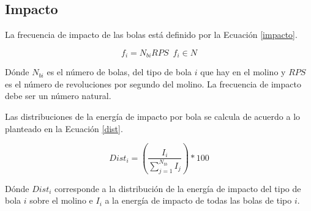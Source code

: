 \newpage

\subsection{Impacto}

\noindent
\justify

La frecuencia de impacto de las bolas est\'a definido por la Ecuaci\'on \ref{impacto}.

\begin{equation}
f_i = N_{bi} RPS \, \, \, f_i \in N
\label{impacto}
\end{equation}

\noindent
\justify

D\'onde $N_{bi}$ es el n\'umero de bolas, del tipo de bola $i$ que hay en el molino y $RPS$ es el n\'umero de revoluciones por segundo del molino. La frecuencia de impacto debe ser un n\'umero natural.

\noindent
\justify

Las distribuciones de la energ\'ia de impacto por bola se calcula de acuerdo a lo planteado en la Ecuaci\'on \ref{dist}.

\begin{equation}
Dist_i = \left( \frac{I_i}{\sum _{j=1} ^{N_{tb}} I_j} \right) *100
\label{dist}
\end{equation}

\noindent
\justify

D\'onde $Dist_i$ corresponde a la distribuci\'on de la energ\'ia de impacto del tipo de bola $i$ sobre el molino e $I_i$ a la energ\'ia de impacto de todas las bolas de tipo $i$.